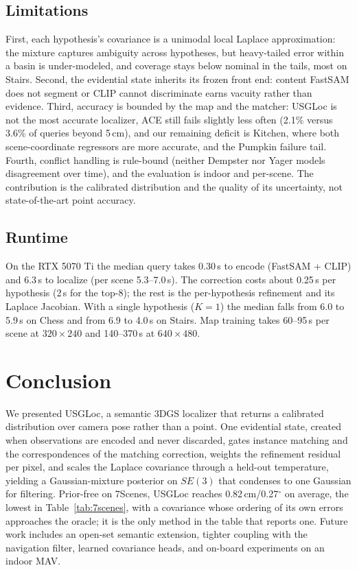 \documentclass[journal]{IEEEtran}
\newcommand{\method}{USGLoc}
\begin{document}
\subsection{Limitations}
First, each hypothesis's covariance is a unimodal local Laplace approximation: the mixture captures ambiguity across hypotheses, but heavy-tailed error within a basin is under-modeled, and coverage stays below nominal in the tails, most on Stairs. Second, the evidential state inherits its frozen front end: content FastSAM does not segment or CLIP cannot discriminate earns vacuity rather than evidence. Third, accuracy is bounded by the map and the matcher: \method{} is not the most accurate localizer, ACE still fails slightly less often (2.1\% versus 3.6\% of queries beyond 5\,cm), and our remaining deficit is Kitchen, where both scene-coordinate regressors are more accurate, and the Pumpkin failure tail. Fourth, conflict handling is rule-bound (neither Dempster nor Yager models disagreement over time), and the evaluation is indoor and per-scene. The contribution is the calibrated distribution and the quality of its uncertainty, not state-of-the-art point accuracy.

\subsection{Runtime}
On the RTX 5070 Ti the median query takes 0.30\,s to encode (FastSAM + CLIP) and 6.3\,s to localize (per scene 5.3--7.0\,s). The correction costs about 0.25\,s per hypothesis (2\,s for the top-8); the rest is the per-hypothesis refinement and its Laplace Jacobian. With a single hypothesis ($K{=}1$) the median falls from 6.0 to 5.9\,s on Chess and from 6.9 to 4.0\,s on Stairs. Map training takes 60--95\,s per scene at $320{\times}240$ and 140--370\,s at $640{\times}480$.

\section{Conclusion}
We presented \method{}, a semantic 3DGS localizer that returns a calibrated distribution over camera pose rather than a point. One evidential state, created when observations are encoded and never discarded, gates instance matching and the correspondences of the matching correction, weights the refinement residual per pixel, and scales the Laplace covariance through a held-out temperature, yielding a Gaussian-mixture posterior on $SE(3)$ that condenses to one Gaussian for filtering. Prior-free on 7Scenes, \method{} reaches 0.82\,cm/0.27$^\circ$ on average, the lowest in Table~\ref{tab:7scenes}, with a covariance whose ordering of its own errors approaches the oracle; it is the only method in the table that reports one. Future work includes an open-set semantic extension, tighter coupling with the navigation filter, learned covariance heads, and on-board experiments on an indoor MAV.



\end{document}
